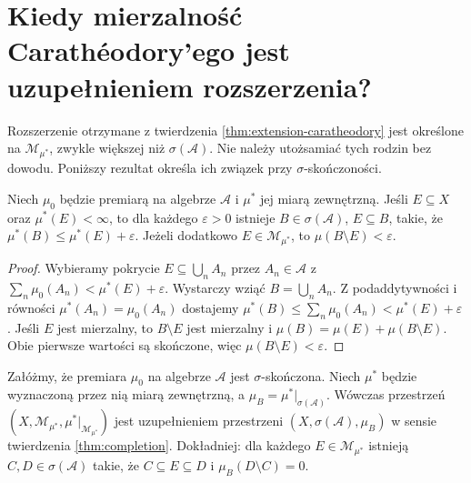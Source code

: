 \section{Kiedy mierzalność Carathéodory'ego jest uzupełnieniem rozszerzenia?}

Rozszerzenie otrzymane z twierdzenia
\ref{thm:extension-caratheodory} jest określone na
$\mathcal M_{\mu^*}$, zwykle większej niż $\sigma(\mathcal A)$.
Nie należy utożsamiać tych rodzin bez dowodu.
Poniższy rezultat określa ich związek przy
$\sigma$-skończoności.

\begin{lemat}
\label{lem:outer-approx-algebra}
Niech $\mu_0$ będzie premiarą na algebrze $\mathcal A$ i
$\mu^*$ jej miarą zewnętrzną. Jeśli $E\subseteq X$ oraz
$\mu^*(E)<\infty$, to dla każdego $\varepsilon>0$
istnieje $B\in\sigma(\mathcal A)$, $E\subseteq B$, takie, że
$\mu^*(B)\le\mu^*(E)+\varepsilon$.
Jeżeli dodatkowo $E\in\mathcal M_{\mu^*}$, to
$\mu(B\setminus E)<\varepsilon$.
\end{lemat}

\begin{proof}
Wybieramy pokrycie $E\subseteq\bigcup_nA_n$ przez
$A_n\in\mathcal A$ z $\sum_n\mu_0(A_n)<\mu^*(E)+\varepsilon$.
Wystarczy wziąć $B=\bigcup_nA_n$. Z podaddytywności i
równości $\mu^*(A_n)=\mu_0(A_n)$ dostajemy
$\mu^*(B)\le\sum_n\mu_0(A_n)<\mu^*(E)+\varepsilon$.
Jeśli $E$ jest mierzalny, to $B\setminus E$ jest mierzalny
i $\mu(B)=\mu(E)+\mu(B\setminus E)$.
Obie pierwsze wartości są skończone, więc
$\mu(B\setminus E)<\varepsilon$.
\end{proof}

\begin{twierdzenie}
\label{thm:caratheodory-completion}
Załóżmy, że premiara $\mu_0$ na algebrze $\mathcal A$
jest $\sigma$-skończona. Niech $\mu^*$ będzie wyznaczoną
przez nią miarą zewnętrzną, a $\mu_B=\mu^*|_{\sigma(\mathcal A)}$.
Wówczas przestrzeń
$(X,\mathcal M_{\mu^*},\mu^*|_{\mathcal M_{\mu^*}})$
jest uzupełnieniem przestrzeni
$(X,\sigma(\mathcal A),\mu_B)$ w sensie twierdzenia
\ref{thm:completion}. Dokładniej: dla każdego
$E\in\mathcal M_{\mu^*}$ istnieją
$C,D\in\sigma(\mathcal A)$ takie, że
$C\subseteq E\subseteq D$ i $\mu_B(D\setminus C)=0$.
\end{twierdzenie}

